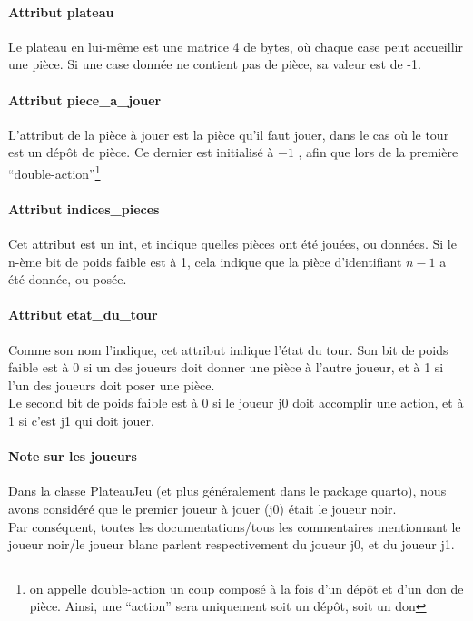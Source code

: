 \documentclass{article}
\begin{document}
\paragraph{Attribut plateau}
Le plateau en lui-même est une matrice 4  de bytes, o\`u
chaque case peut accueillir une pièce. Si une case donnée ne contient
pas de pièce, sa valeur est de -1.

\paragraph{Attribut piece\_a\_jouer}
L'attribut de la pièce à jouer est la pièce qu'il faut jouer, dans le
cas o\`u le tour est un dépôt de pièce. Ce dernier est initialisé à
\(-1\) , afin que lors de la première ``double-action''\footnote{ on
  appelle double-action un coup composé à la fois d'un dépôt et d'un
  don de pièce. Ainsi, une ``action'' sera uniquement soit un dépôt,
  soit un don}

\paragraph{Attribut indices\_pieces}
Cet attribut est un int, et indique quelles pièces ont été jouées, ou données.
Si le n-ème bit de poids faible est à 1, cela indique que la pièce
d'identifiant \(n-1\) a été donnée, ou posée.

\paragraph{Attribut etat\_du\_tour}
Comme son nom l'indique, cet attribut indique l'état du tour.
Son bit de poids faible est à 0 si un des joueurs doit donner une
pièce à l'autre joueur, et à 1 si l'un des joueurs doit poser une
pièce.\\
Le second bit de poids faible est à 0 si le joueur j0 doit accomplir
une action, et à 1 si c'est j1 qui doit jouer.


\paragraph{Note sur les joueurs}
Dans la classe PlateauJeu (et plus généralement dans le package
quarto), nous avons considéré que le premier joueur à jouer (j0) était
le joueur noir. \\
Par conséquent, toutes les documentations/tous les
commentaires mentionnant le joueur noir/le joueur blanc parlent
respectivement du joueur j0, et du joueur j1.
\end{document}
